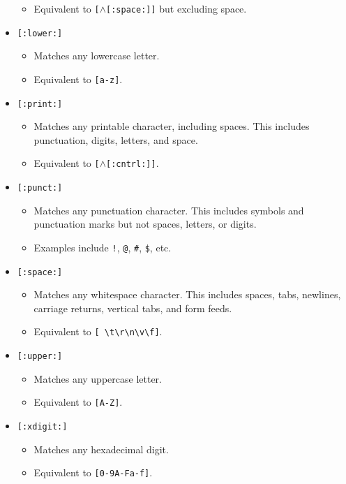 \documentclass{report}
\begin{document}
\begin{itemize}
\begin{itemize}
            \item Equivalent to \texttt{[$\land$[:space:]]} but excluding space.
        \end{itemize}
    \item \texttt{[:lower:]}
        \begin{itemize}
            \item Matches any lowercase letter.
            \item Equivalent to \texttt{[a-z]}.
        \end{itemize}
    \item \texttt{[:print:]}
        \begin{itemize}
            \item Matches any printable character, including spaces. This includes punctuation, digits, letters, and space.
            \item Equivalent to \texttt{[$\land$[:cntrl:]]}.
        \end{itemize}
    \item \texttt{[:punct:]}
        \begin{itemize}
            \item Matches any punctuation character. This includes symbols and punctuation marks but not spaces, letters, or digits.
            \item Examples include \texttt{!}, \texttt{@}, \texttt{\#}, \texttt{\$}, etc.
        \end{itemize}
    \item \texttt{[:space:]}
        \begin{itemize}
            \item Matches any whitespace character. This includes spaces, tabs, newlines, carriage returns, vertical tabs, and form feeds.
            \item Equivalent to \texttt{[ \textbackslash{}t\textbackslash{}r\textbackslash{}n\textbackslash{}v\textbackslash{}f]}.
        \end{itemize}
    \item \texttt{[:upper:]}
        \begin{itemize}
            \item Matches any uppercase letter.
            \item Equivalent to \texttt{[A-Z]}.
        \end{itemize}
    \item \texttt{[:xdigit:]}
        \begin{itemize}
            \item Matches any hexadecimal digit.
            \item Equivalent to \texttt{[0-9A-Fa-f]}.
        \end{itemize}
\end{itemize}
\pagebreak 
\end{document}
